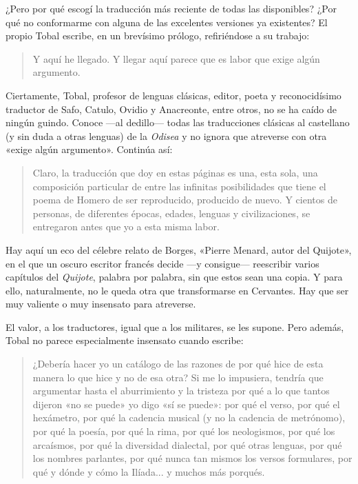 \documentclass[11pt,a4paper]{article}
\begin{document}
¿Pero por qué escogí la traducción más reciente de todas las disponibles? ¿Por qué no conformarme con alguna de las excelentes versiones ya existentes? 
El propio Tobal escribe, en un brevísimo prólogo, refiriéndose a su trabajo:

\begin{quotation}
Y aquí he llegado. Y llegar aquí parece que es labor que exige algún argumento.
\end{quotation}

Ciertamente, Tobal, profesor de lenguas clásicas, editor, poeta y reconocidísimo traductor de Safo, Catulo, Ovidio y Anacreonte, entre otros, no se ha caído de ningún guindo. Conoce ---al dedillo--- todas las traducciones clásicas al castellano (y sin duda a otras lenguas) de la \emph{Odisea} y no ignora que atreverse con otra «exige algún argumento». Continúa así:

\begin{quotation}
Claro, la traducción que doy en estas páginas es una, esta sola, una composición particular de entre las infinitas posibilidades que tiene el poema de Homero de ser reproducido, producido de nuevo. Y cientos de personas, de diferentes épocas, edades, lenguas y civilizaciones, se entregaron antes que yo a esta misma labor.
\end{quotation}

Hay aquí un eco del célebre relato de Borges, «Pierre Menard, autor del Quijote», en el que un oscuro escritor francés decide ---y consigue--- reescribir varios capítulos del \emph{Quijote}, palabra por palabra, sin que estos sean una copia. Y para ello, naturalmente, no le queda otra que transformarse en Cervantes. Hay que ser muy valiente o muy insensato para atreverse.

El valor, a los traductores, igual que a los militares, se les supone. Pero además, Tobal no parece especialmente insensato cuando escribe:

\begin{quotation}
¿Debería hacer yo un catálogo de las razones de por qué hice de esta manera lo que hice y no de esa otra? Si me lo impusiera, tendría que argumentar hasta el aburrimiento y la tristeza por qué a lo que tantos dijeron «no se puede» yo digo «sí se puede»: por qué el verso, por qué el hexámetro, por qué la cadencia musical (y no la cadencia de metrónomo), por qué la poesía, por qué la rima, por qué los neologismos, por qué los arcaísmos, por qué la diversidad dialectal, por qué otras lenguas, por qué los nombres parlantes, por qué nunca tan mismos los versos formulares, por qué y dónde y cómo la Ilíada... y muchos más porqués.
\end{quotation}
\end{document}
